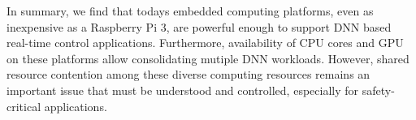 

In summary, we find that todays embedded computing platforms, even as
inexpensive as a Raspberry Pi 3, are powerful enough to support
DNN based real-time control applications. Furthermore, availability of
CPU cores and GPU on these platforms allow consolidating mutiple DNN
workloads. However, shared resource contention among these diverse
computing resources remains an important issue that must be understood
and controlled, especially for safety-critical applications.

